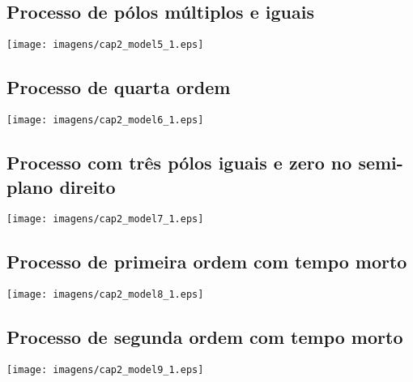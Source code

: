 \subsection{Processo de pólos múltiplos e iguais}

    \begin{center}
        \texttt{[image: imagens/cap2\_model5\_1.eps]}
    \end{center}

\subsection{Processo de quarta ordem}

    \begin{center}
        \texttt{[image: imagens/cap2\_model6\_1.eps]}
    \end{center}

\subsection{Processo com três pólos iguais e zero no semi-plano direito}

    \begin{center}
        \texttt{[image: imagens/cap2\_model7\_1.eps]}
    \end{center}

\subsection{Processo de primeira ordem com tempo morto}

    \begin{center}
        \texttt{[image: imagens/cap2\_model8\_1.eps]}
    \end{center}

\subsection{Processo de segunda ordem com tempo morto}

    \begin{center}
        \texttt{[image: imagens/cap2\_model9\_1.eps]}
    \end{center}

